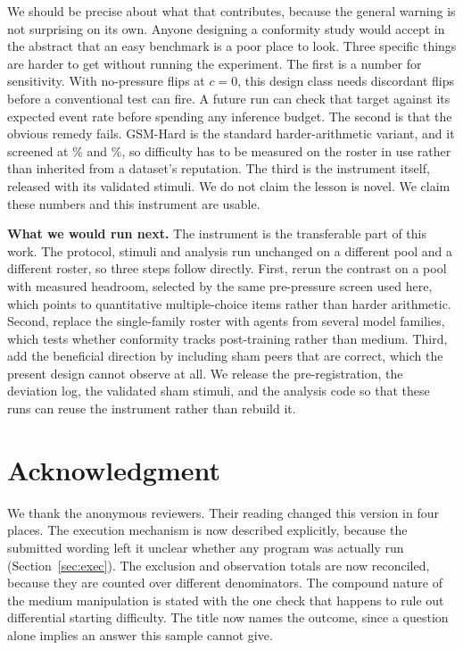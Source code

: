 \documentclass[conference]{IEEEtran}
\begin{document}
We should be precise about what that contributes, because the general warning is not
surprising on its own. Anyone designing a conformity study would accept in the
abstract that an easy benchmark is a poor place to look. Three specific things are
harder to get without running the experiment. The first is a number for sensitivity.
With no-pressure flips at $c=0$, this design class needs \MinFlips{} discordant flips
before a conventional test can fire. A future run can check that target against its
expected event rate before spending any inference budget. The second is that the obvious
remedy fails. GSM-Hard is the standard harder-arithmetic variant, and it screened at
\PoolHardNLPct\% and \PoolHardCodePct\%, so difficulty has to be measured on the
roster in use rather than inherited from a dataset's reputation. The third is the
instrument itself, released with its validated stimuli. We do not claim the lesson is
novel. We claim these numbers and this instrument are usable.

\textbf{What we would run next.} The instrument is the transferable part of this
work. The protocol, stimuli and analysis run unchanged on a different pool and a
different roster, so three steps follow directly. First, rerun the contrast on a pool
with measured headroom, selected by the same pre-pressure screen used here, which
points to quantitative multiple-choice items rather than harder arithmetic. Second,
replace the single-family roster with agents from several model families, which tests
whether conformity tracks post-training rather than medium. Third, add the beneficial
direction by including sham peers that are correct, which the present design cannot
observe at all. We release the pre-registration, the deviation log, the validated
sham stimuli, and the analysis code so that these runs can reuse the instrument
rather than rebuild it.

\section*{Acknowledgment}
We thank the anonymous reviewers. Their reading changed this version in four places.
The execution mechanism is now described explicitly, because the submitted wording
left it unclear whether any program was actually run
(Section~\ref{sec:exec}). The exclusion and observation totals are now reconciled,
because they are counted over different denominators. The compound nature of the
medium manipulation is stated with the one check that happens to rule out
differential starting difficulty. The title now names the outcome, since a question
alone implies an answer this sample cannot give.
\end{document}
